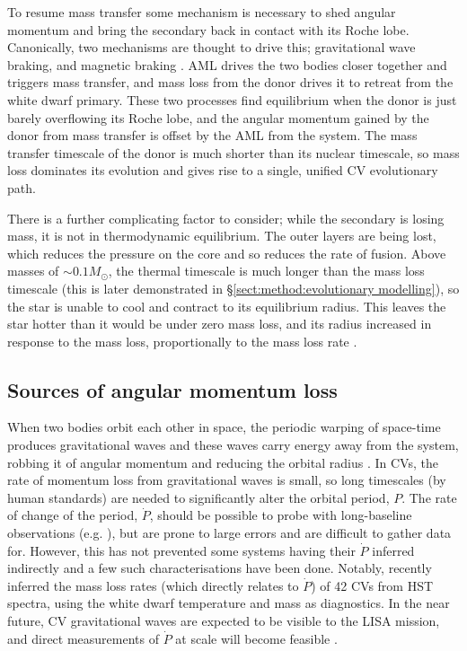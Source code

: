 To resume mass transfer some mechanism is necessary to shed angular momentum and bring the secondary back in contact with its Roche lobe. 
Canonically, two mechanisms are thought to drive this; gravitational wave braking, and magnetic braking \citep{knigge2006,knigge11}.
AML drives the two bodies closer together and triggers mass transfer, and mass loss from the donor drives it to retreat from the white dwarf primary. These two processes find equilibrium when the donor is just barely overflowing its Roche lobe, and the angular momentum gained by the donor from mass transfer is offset by the AML from the system.
The mass transfer timescale of the donor is much shorter than its nuclear timescale, so mass loss dominates its evolution and gives rise to a single, unified CV evolutionary path.

There is a further complicating factor to consider; while the secondary is losing mass, it is not in thermodynamic equilibrium. The outer layers are being lost, which reduces the pressure on the core and so reduces the rate of fusion. 
Above masses of $\sim 0.1 M_\odot$, the thermal timescale is much longer than the mass loss timescale (this is later demonstrated in \S\ref{sect:method:evolutionary modelling}), so the star is unable to cool and contract to its equilibrium radius. This leaves the star hotter than it would be under zero mass loss, and its radius increased in response to the mass loss, proportionally to the mass loss rate \citep{knigge2006, knigge11}.


\subsection{Sources of angular momentum loss}
\label{sect:introduction:AMLMechs}

When two bodies orbit each other in space, the periodic warping of space-time produces gravitational waves \citep{einstein1918} and these waves carry energy away from the system, robbing it of angular momentum and reducing the orbital radius \citep{Paczynski1967}. In CVs, the rate of momentum loss from gravitational waves is small, so long timescales (by human standards) are needed to significantly alter the orbital period, $P$.
The rate of change of the period, $\dot P$, should be possible to probe with long-baseline observations (e.g. \citealt{qian2007, shafter2021}), but are prone to large errors and are difficult to gather data for. However, this has not prevented some systems having their $\dot P$ inferred indirectly and a few such characterisations have been done. 
Notably, \citet{pala2020} recently inferred the mass loss rates (which directly relates to $\dot P$) of 42 CVs from HST spectra, using the white dwarf temperature and mass as diagnostics. 
In the near future, CV gravitational waves are expected to be visible to the LISA mission, and direct measurements of $\dot P$ at scale will become feasible \citep{Meliani2000, kalomeni2016}. 

